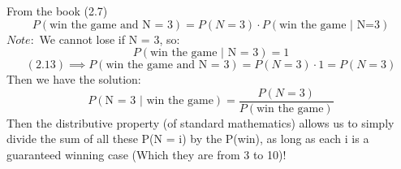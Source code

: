 \documentclass{article}
\begin{document}
From the book (2.7)
\begin{equation}
  P(\text{win the game and N = 3}) = P(N = 3) \cdot P(\text{win the game $|$ N=3})
\end{equation}
$Note:$ We cannot lose if N = 3, so:
\begin{equation}
P(\text{win the game $|$ N = 3}) = 1 
\end{equation}
\begin{equation}
(2.13) \implies P(\text{win the game and N = 3}) = P(N = 3) \cdot 1 = P(N = 3)
\end{equation}
Then we have the solution:
\begin{equation}
    P(\text{N = 3 $|$ win the game}) = \frac{P(N = 3)}{P(\text{win the game})}
\end{equation}
Then the distributive property (of standard mathematics) allows us to simply divide the sum of all these P(N = i) by the P(win), as long as each i is a guaranteed winning case (Which they are from 3 to 10)!
\end{document}
